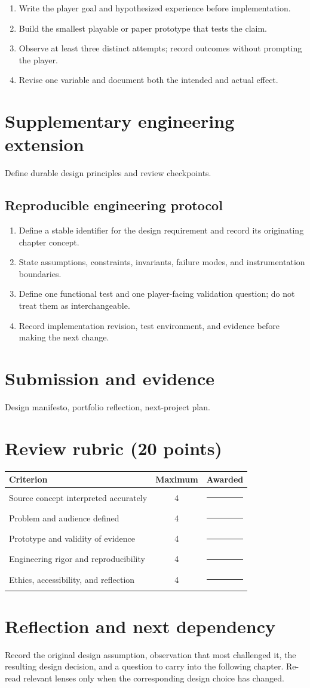 \documentclass[11pt]{article}
\begin{document}
\begin{enumerate}
\item Write the player goal and hypothesized experience before implementation.
\item Build the smallest playable or paper prototype that tests the claim.
\item Observe at least three distinct attempts; record outcomes without prompting the player.
\item Revise one variable and document both the intended and actual effect.
\end{enumerate}

\section{Supplementary engineering extension}
Define durable design principles and review checkpoints.


\subsection{Reproducible engineering protocol}
\begin{enumerate}
\item Define a stable identifier for the design requirement and record its originating chapter concept.
\item State assumptions, constraints, invariants, failure modes, and instrumentation boundaries.
\item Define one functional test and one player-facing validation question; do not treat them as interchangeable.
\item Record implementation revision, test environment, and evidence before making the next change.
\end{enumerate}

\section{Submission and evidence}
Design manifesto, portfolio reflection, next-project plan.


\section{Review rubric (20 points)}
\begin{tabularx}{\linewidth}{@{}Xcc@{}}\toprule
Criterion & Maximum & Awarded \\ \midrule
Source concept interpreted accurately & 4 & \rule{0.45in}{0.4pt}\\
Problem and audience defined & 4 & \rule{0.45in}{0.4pt}\\
Prototype and validity of evidence & 4 & \rule{0.45in}{0.4pt}\\
Engineering rigor and reproducibility & 4 & \rule{0.45in}{0.4pt}\\
Ethics, accessibility, and reflection & 4 & \rule{0.45in}{0.4pt}\\\bottomrule
\end{tabularx}

\section{Reflection and next dependency}
Record the original design assumption, observation that most challenged it, the resulting design decision, and a question to carry into the following chapter. Re-read relevant lenses only when the corresponding design choice has changed.
\end{document}
